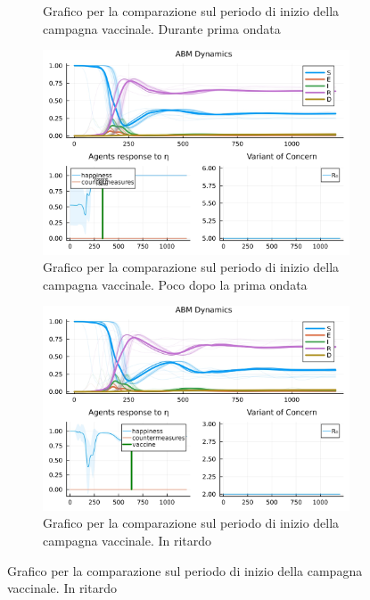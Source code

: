 \begin{figure}[!hb]
\begin{subfigure}[b]{0.45\textwidth}
		\caption{Grafico per la comparazione sul periodo di inizio della campagna vaccinale. Durante prima ondata}
		\label{fig:comparison_vax_2}
	\end{subfigure}
	\hfill
	\begin{subfigure}[b]{0.45\textwidth}
		\centering
		\includegraphics[width=\textwidth]{img/SocialNetworkABM_5_V.jpg}
		\caption{Grafico per la comparazione sul periodo di inizio della campagna vaccinale. Poco dopo la prima ondata}
		\label{fig:comparison_vax_3}
	\end{subfigure}
	\hfill
	\begin{subfigure}[b]{0.45\textwidth}
		\centering
		\includegraphics[width=\textwidth]{img/SocialNetworkABM_2_V.jpg}
		\caption{Grafico per la comparazione sul periodo di inizio della campagna vaccinale. In ritardo}
		\label{fig:comparison_vax_4}
	\end{subfigure}
\end{figure}
\newpage

